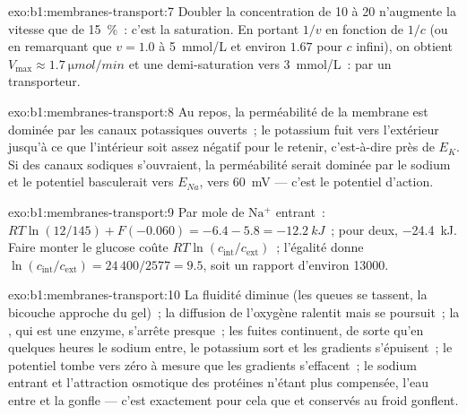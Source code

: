 \begin{solution}{exo:b1:membranes-transport:7}
Doubler la concentration de 10 à 20 n'augmente la vitesse que de
\qty{15}{\%}~: c'est la saturation. En portant $1/v$ en fonction de
$1/c$ (ou en remarquant que $v = 1.0$ à \qty{5}{mmol/L} et environ
$1.67$ pour $c$ infini), on obtient
$V_{\max} \approx \qty{1.7}{\micro mol/min}$ et une demi-saturation vers
\qty{3}{mmol/L}~:  par un transporteur.
\end{solution}

\begin{solution}{exo:b1:membranes-transport:8}
Au repos, la perméabilité de la membrane est dominée par les canaux
potassiques ouverts~; le potassium fuit vers l'extérieur jusqu'à ce que
l'intérieur soit assez négatif pour le retenir, c'est-à-dire près de
$E_K$. Si des canaux sodiques s'ouvraient, la perméabilité serait
dominée par le sodium et le potentiel basculerait vers $E_{Na}$, vers
\qty{+60}{mV} --- c'est le potentiel d'action.
\end{solution}

\begin{solution}{exo:b1:membranes-transport:9}
Par mole de $\mathrm{Na^+}$ entrant~: $RT\ln(12/145) + F(-0.060) = -6.4 - 5.8
= \qty{-12.2}{kJ}$~; pour deux, \qty{-24.4}{kJ}. Faire monter le glucose
coûte $RT\ln(c_{\text{int}}/c_{\text{ext}})$~; l'égalité donne
$\ln(c_{\text{int}}/c_{\text{ext}}) = 24\,400/2577 = 9.5$, soit un
rapport d'environ \num{13000}.
\end{solution}

\begin{solution}{exo:b1:membranes-transport:10}
La fluidité diminue (les queues se tassent, la bicouche approche du
gel)~; la diffusion de l'oxygène ralentit mais se poursuit~; la ,
qui est une enzyme, s'arrête presque~; les fuites continuent, de sorte
qu'en quelques heures le sodium entre, le potassium sort et les
gradients s'épuisent~; le potentiel tombe vers zéro à mesure que les
gradients s'effacent~; le sodium entrant et l'attraction osmotique des
protéines n'étant plus compensée, l'eau entre et la  gonfle ---
c'est exactement pour cela que  et  conservés au froid
gonflent.
\end{solution}

